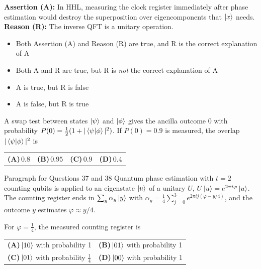 \documentclass[11pt,a4paper]{article}
\newcommand{\optlabel}[1]{\textbf{(#1)}}
\newenvironment{qitem}[1]{\begin{list}{}{\setlength{\leftmargin}{3.3em}\setlength{\labelwidth}{3.1em}%
  \setlength{\labelsep}{0.2em}\setlength{\topsep}{3pt}\setlength{\parsep}{3pt}}\item[\textbf{Q.#1}\hfill]}{\end{list}}
\newcommand{\qsep}{\par\vspace{2pt}{\color{black!15}\hrule}\vspace{4pt}}
\begin{document}
\begin{qitem}{35}
\textbf{Assertion (A):} In HHL, measuring the clock register immediately after phase estimation would destroy the superposition over eigencomponents that $\ket x$ needs.\\[1mm]
\textbf{Reason (R):} The inverse QFT is a unitary operation.
\begin{itemize}[leftmargin=2.6em, labelsep=0.4em, itemsep=2pt, topsep=3pt]
\item[\optlabel{A}] Both Assertion (A) and Reason (R) are true, and R is the correct explanation of A
\item[\optlabel{B}] Both A and R are true, but R is \emph{not} the correct explanation of A
\item[\optlabel{C}] A is true, but R is false
\item[\optlabel{D}] A is false, but R is true
\end{itemize}
\end{qitem}
\qsep

\begin{qitem}{36}
A swap test between states $\ket\psi$ and $\ket\phi$ gives the ancilla outcome 0 with probability $P(0) = \tfrac12(1 + |\braket{\psi|\phi}|^2)$. If $P(0) = 0.9$ is measured, the overlap
$|\braket{\psi|\phi}|^2$ is
\par\smallskip\noindent\begin{tabularx}{\linewidth}{@{}*{4}{L}@{}}
\optlabel{A}\,$0.8$ & \optlabel{B}\,$0.95$ & \optlabel{C}\,$0.9$ & \optlabel{D}\,$0.4$
\end{tabularx}
\end{qitem}
\qsep

\begin{passagebox}{Paragraph for Questions 37 and 38}
Quantum phase estimation with $t = 2$ counting qubits is applied to an eigenstate $\ket u$ of a unitary $U$, $U\ket u = e^{2\pi i\varphi}\ket u$. The counting
register ends in $\sum_y\alpha_y\ket y$ with $\alpha_y = \frac14\sum_{j=0}^{3}e^{2\pi i j(\varphi - y/4)}$, and the outcome $y$ estimates $\varphi \approx y/4$.
\end{passagebox}
\begin{qitem}{37}
For $\varphi = \tfrac14$, the measured counting register is
\par\smallskip\noindent\begin{tabularx}{\linewidth}{@{}*{2}{L}@{}}
\optlabel{A}\,$\ket{10}$ with probability 1 & \optlabel{B}\,$\ket{01}$ with probability 1 \\[3pt]
\optlabel{C}\,$\ket{01}$ with probability $\tfrac14$ & \optlabel{D}\,$\ket{00}$ with probability 1
\end{tabularx}
\end{qitem}
\qsep
\end{document}
